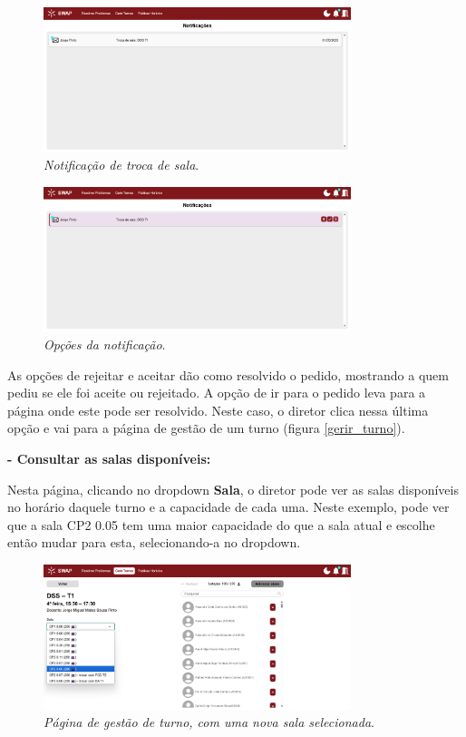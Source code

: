 \documentclass[12pt, a4paper]{article}
\begin{document}
\begin{figure}[H]
    \centering
    \includegraphics[width=0.8\textwidth]{res/manual/notificacao_troca_sala.png}
    \caption{\emph{Notificação de troca de sala}.}
    \label{notificacao_troca_sala}
\end{figure}

\begin{figure}[H]
    \centering
    \includegraphics[width=0.8\textwidth]{res/manual/notificacao_troca_sala_hover.png}
    \caption{\emph{Opções da notificação}.}
    \label{notificacao_troca_sala_hover}
\end{figure}

As opções de rejeitar e aceitar dão como resolvido o pedido, mostrando
a quem pediu se ele foi aceite ou rejeitado. A opção de ir para o pedido leva para
a página onde este pode ser resolvido.
Neste caso, o diretor clica nessa última opção e vai para a página de gestão
de um turno (figura \ref{gerir_turno}).

\textbf{- Consultar as salas disponíveis:}

Nesta página, clicando no dropdown \textbf{Sala}, o diretor pode ver as salas disponíveis no horário
daquele turno e a capacidade de cada uma. Neste exemplo, pode ver que a sala CP2 0.05 tem uma maior
capacidade do que a sala atual e escolhe então mudar para esta, selecionando-a no dropdown.

\begin{figure}[H]
    \centering
    \includegraphics[width=0.8\textwidth]{res/manual/trocar_sala.png}
    \caption{\emph{Página de gestão de turno, com uma nova sala selecionada}.}
    \label{trocar_sala}
\end{figure}
\end{document}
